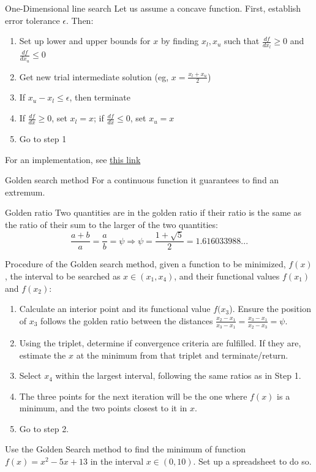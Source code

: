 \documentclass[c]{beamer}
\begin{document}
\begin{frame}{One-Dimensional line search}
Let us assume a concave function. First, establish error tolerance $\epsilon$. Then:
  \begin{enumerate}
    \item Set up lower and upper bounds for $x$ by finding $x_l,x_u$ such that $\frac{df}{dx_l}\geq 0$ and $\frac{df}{dx_u}\leq 0$
    \item Get new trial intermediate solution (eg, $x=\frac{x_l+x_u}{2}$)
    \item If $x_u-x_l\leq \epsilon$, then terminate
    \item If $\frac{df}{dx}\geq 0$, set $x_l=x$; if $\frac{df}{dx}\leq 0$, set $x_u=x$
    \item Go to step 1
  \end{enumerate}

  For an implementation, see \href{https://machinelearningmastery.com/line-search-optimization-with-python/}{this link}
\end{frame}
\begin{frame}[allowframebreaks]{Golden search method}
For a continuous function it guarantees to find an extremum.

\begin{block}{Golden ratio}
   Two quantities are in the golden ratio if their ratio is the same as the ratio of their sum to the larger of the two quantities:
\[
\frac{a+b}{a}=\frac{a}{b}=\psi \Rightarrow \psi=\frac{1+\sqrt{5}}{2}=1.616033988...
\]
\end{block}

Procedure of the Golden search method, given a function  to be minimized, $f(x)$, the interval to be searched as $x\in(x_1,x_4)$, and their functional values $f(x_1)$ and $f(x_2)$:
\begin{enumerate}
  \item Calculate an interior point and its functional value $f(x_3$). Ensure the position of $x_3$ follows the golden ratio between the distances $\frac{x_2-x_1}{x_3-x_1}=\frac{x_3-x_1}{x_2-x_3}=\psi$.
  \item Using the triplet, determine if convergence criteria are fulfilled. If they are, estimate the $x$ at the minimum from that triplet and terminate/return.
  \item Select $x_4$ within the largest interval, following the same ratios as in Step 1.
  \item The three points for the next iteration will be the one where $f(x)$ is a minimum, and the two points closest to it in $x$.
  \item Go to step 2.
\end{enumerate}

\begin{Exercise}
  Use the Golden Search method to find the minimum of function $f(x)=x^2-5x+13$ in the interval $x\in(0,10)$. Set up a spreadsheet to do so.
\end{Exercise}

\end{frame}
\end{document}
